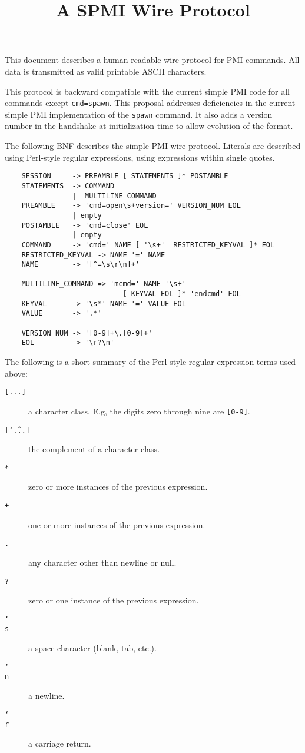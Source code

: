\documentclass{article}
\title{A SPMI Wire Protocol}
\begin{document}
%
%
%
This document describes a human-readable wire protocol for PMI
commands.  All data is transmitted as valid printable ASCII
characters.

This protocol is backward compatible with the current simple PMI code
for all commands except \texttt{cmd=spawn}.   This proposal addresses
deficiencies in the current simple PMI implementation of the
\texttt{spawn} command.  It also adds a version number in the
handshake at initialization time to allow evolution of the format.

The following BNF describes the simple PMI wire protocol.  Literals are 
described using Perl-style regular expressions, using expressions within single
quotes.
\begin{verbatim}
    SESSION     -> PREAMBLE [ STATEMENTS ]* POSTAMBLE
    STATEMENTS  -> COMMAND
                |  MULTILINE_COMMAND
    PREAMBLE    -> 'cmd=open\s+version=' VERSION_NUM EOL
                | empty
    POSTAMBLE   -> 'cmd=close' EOL
                | empty
    COMMAND     -> 'cmd=' NAME [ '\s+'  RESTRICTED_KEYVAL ]* EOL
    RESTRICTED_KEYVAL -> NAME '=' NAME
    NAME        -> '[^=\s\r\n]+'
    
    MULTILINE_COMMAND => 'mcmd=' NAME '\s+' 
                            [ KEYVAL EOL ]* 'endcmd' EOL
    KEYVAL      -> '\s*' NAME '=' VALUE EOL
    VALUE       -> '.*'

    VERSION_NUM -> '[0-9]+\.[0-9]+'
    EOL         -> '\r?\n'
\end{verbatim}
The following is a short summary of the Perl-style regular expression
terms used above:
\begin{description}
\item[\texttt{[...]}]a character class.  E.g, the digits zero through
 nine are \texttt{[0-9]}.
\item[\texttt{[\char`\^...]}]the complement of a character class.
\item[\texttt{*}]zero or more instances of the previous expression.
\item[\texttt{+}]one or more instances of the previous expression.
\item[\texttt{.}]any character other than newline or null.
\item[\texttt{?}]zero or one instance of the previous expression.
\item[\texttt{\char`\\s}]a space character (blank, tab, etc.).
\item[\texttt{\char`\\n}]a newline.
\item[\texttt{\char`\\r}]a carriage return.
\end{description}
\end{document}
